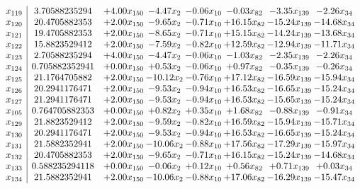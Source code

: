 \documentclass[8pt]{article}
\begin{document}
\[\begin{array}{c| c c@{\hskip 2pt} c@{\hskip 2pt} c@{\hskip 2pt} c@{\hskip 2pt} c@{\hskip 2pt} c@{\hskip 2pt} }
 x_{119}   &  3.70588235294 & +  4.00 x_{150} & -4.47 x_{2} & -0.06 x_{10} & -0.03 x_{82} & -3.35 x_{139} & -2.26 x_{34}\\
 x_{120}   &  20.4705882353 & +  2.00 x_{150} & -9.65 x_{2} & -0.71 x_{10} & + 16.15 x_{82} & -15.24 x_{139} & -14.68 x_{34}\\
 x_{121}   &  19.4705882353 & +  2.00 x_{150} & -8.65 x_{2} & -0.71 x_{10} & + 15.15 x_{82} & -14.24 x_{139} & -13.68 x_{34}\\
 x_{122}   &  15.8823529412 & +  2.00 x_{150} & -7.59 x_{2} & -0.82 x_{10} & + 12.59 x_{82} & -12.94 x_{139} & -11.71 x_{34}\\
 x_{123}   &  2.70588235294 & +  4.00 x_{150} & -4.47 x_{2} & -0.06 x_{10} & -1.03 x_{82} & -2.35 x_{139} & -2.26 x_{34}\\
 x_{124}   &  0.705882352941 & +  0.00 x_{150} & +  0.53 x_{2} & -0.06 x_{10} & +  0.97 x_{82} & -0.35 x_{139} & -0.26 x_{34}\\
 x_{125}   &  21.1764705882 & +  2.00 x_{150} & -10.12 x_{2} & -0.76 x_{10} & + 17.12 x_{82} & -16.59 x_{139} & -15.94 x_{34}\\
 x_{126}   &  20.2941176471 & +  2.00 x_{150} & -9.53 x_{2} & -0.94 x_{10} & + 16.53 x_{82} & -16.65 x_{139} & -15.24 x_{34}\\
 x_{127}   &  21.2941176471 & +  2.00 x_{150} & -9.53 x_{2} & -0.94 x_{10} & + 16.53 x_{82} & -15.65 x_{139} & -15.24 x_{34}\\
 x_{105}   &  0.764705882353 & +  0.00 x_{150} & +  0.82 x_{2} & +  0.35 x_{10} & +  1.68 x_{82} & -0.88 x_{139} & -0.91 x_{34}\\
 x_{129}   &  21.8823529412 & +  2.00 x_{150} & -9.59 x_{2} & -0.82 x_{10} & + 16.59 x_{82} & -15.94 x_{139} & -15.71 x_{34}\\
 x_{130}   &  20.2941176471 & +  2.00 x_{150} & -9.53 x_{2} & -0.94 x_{10} & + 16.53 x_{82} & -16.65 x_{139} & -15.24 x_{34}\\
 x_{131}   &  21.5882352941 & +  2.00 x_{150} & -10.06 x_{2} & -0.88 x_{10} & + 17.56 x_{82} & -17.29 x_{139} & -15.97 x_{34}\\
 x_{132}   &  20.4705882353 & +  2.00 x_{150} & -9.65 x_{2} & -0.71 x_{10} & + 16.15 x_{82} & -15.24 x_{139} & -14.68 x_{34}\\
 x_{133}   &  0.588235294118 & +  0.00 x_{150} & -0.06 x_{2} & +  0.12 x_{10} & +  0.56 x_{82} & +  0.71 x_{139} & +  0.03 x_{34}\\
 x_{134}   &  21.5882352941 & +  2.00 x_{150} & -10.06 x_{2} & -0.88 x_{10} & + 17.06 x_{82} & -16.29 x_{139} & -15.47 x_{34}\\

\end{array}\]
\end{document}
